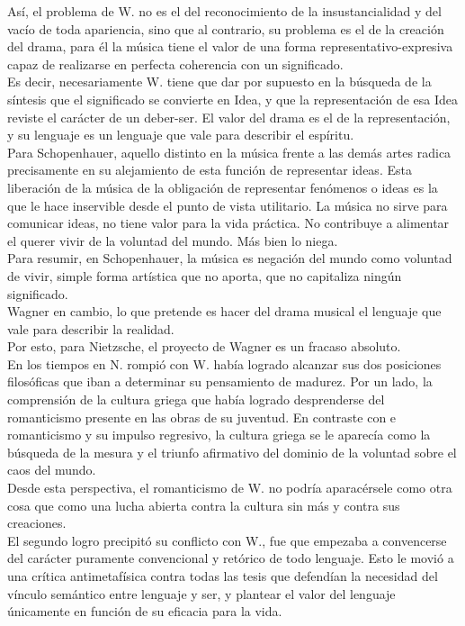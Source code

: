 \documentclass[a4paper, 10pt, twocolumn, spanish]{article}
\begin{document}
Así, el problema de W. no es el del reconocimiento de la
insustancialidad y del vacío de toda apariencia, sino que al
contrario, su problema es el de la creación del drama, para él la
música tiene el valor de una forma representativo-expresiva capaz de
realizarse en perfecta coherencia con un significado.\\[0pt]
Es decir, necesariamente W. tiene que dar por supuesto en la búsqueda
de la síntesis que el significado se convierte en Idea, y que la
representación de esa Idea reviste el carácter de un deber-ser. El
valor del drama es el de la representación, y su lenguaje es un
lenguaje que vale para describir el espíritu.\\[0pt]


Para Schopenhauer, aquello distinto en la música frente a las demás
artes radica precisamente en su alejamiento de esta función de
representar ideas. Esta liberación de la música de la obligación de
representar fenómenos o ideas es la que le hace inservible desde el
punto de vista utilitario. La música no sirve para comunicar ideas, no
tiene valor para la vida práctica. No contribuye a alimentar el
querer vivir de la voluntad del mundo. Más bien lo niega.\\[0pt]

Para resumir, en Schopenhauer, la música es negación del mundo como
voluntad de vivir, simple forma artística que no aporta, que no
capitaliza ningún significado.\\[0pt]
Wagner en cambio, lo que pretende es hacer del drama musical el
lenguaje que vale para describir la realidad.\\[0pt]
Por esto, para Nietzsche, el proyecto de Wagner es un fracaso
absoluto.\\[0pt]

En los tiempos en N. rompió con W. había logrado alcanzar sus dos
posiciones filosóficas que iban a determinar su pensamiento de
madurez. Por un lado, la comprensión de la cultura griega que había
logrado desprenderse del romanticismo presente en las obras de su
juventud. En contraste con e romanticismo y su impulso regresivo, la
cultura griega se le aparecía como la búsqueda de la mesura y el
triunfo afirmativo del dominio de la voluntad sobre el caos del
mundo.\\[0pt]
Desde esta perspectiva, el romanticismo de W. no podría aparacérsele
como otra cosa que como una lucha abierta contra la cultura sin más y
contra sus creaciones.\\[0pt]

El segundo logro precipitó su conflicto con W., fue que empezaba a
convencerse del carácter puramente convencional y retórico de todo
lenguaje. Esto le movió a una crítica antimetafísica contra todas las
tesis que defendían la necesidad del vínculo semántico entre lenguaje
y ser, y plantear el valor del lenguaje únicamente en función de su
eficacia para la vida.\\[0pt]
\end{document}
